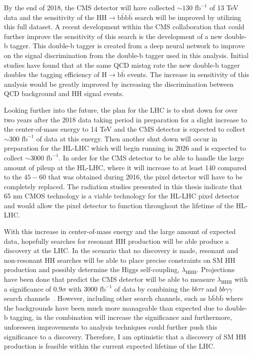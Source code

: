 By the end of 2018, the CMS detector will have collected ${\sim}130$ $\mathrm{fb}^{-1}$ of 13 TeV data and the sensitivity of the $\mathrm{HH}\rightarrow \mathrm{b\bar{b}b\bar{b}}$ search will be improved by utilizing this full dataset. A recent development within the CMS collaboration that could further improve the sensitivity of this search is the development of a new double-b tagger. This double-b tagger is created from a deep neural network to improve on the signal discrimination from the double-b tagger used in this analysis. Initial studies have found that at the same QCD mistag rate the new double-b tagger doubles the tagging efficiency of $\mathrm{H}\rightarrow \mathrm{b\bar{b}}$ events. The increase in sensitivity of this analysis would be greatly improved by increasing the discrimination between QCD background and $\mathrm{HH}$ signal events. 

Looking further into the future, the plan for the LHC is to shut down for over two years after the 2018 data taking period in preparation for a slight increase to the center-of-mass energy to 14 TeV and the CMS detector is expected to collect ${\sim}300$ $\mathrm{fb}^{-1}$ of data at this energy. Then another shut down will occur in preparation for the HL-LHC which will begin running in 2026 and is expected to collect ${\sim}3000$ $\mathrm{fb}^{-1}$. In order for the CMS detector to be able to handle the large amount of pileup at the HL-LHC, where it will increase to at least 140 compared to the $45-60$ that was obtained during 2016, the pixel detector will have to be completely replaced. The radiation studies presented in this thesis indicate that 65 nm CMOS technology is a viable technology for the HL-LHC pixel detector and would allow the pixel detector to function throughout the lifetime of the HL-LHC. 

With this increase in center-of-mass energy and the large amount of expected data, hopefully searches for resonant HH production will be able produce a discovery at the LHC. In the scenario that no discovery is made, resonant and non-resonant HH searches will be able to place precise constraints on SM HH production and possibly determine the Higgs self-coupling, $\lambda_{\mathrm{HHH}}$. Projections have been done that predict the CMS detector will be able to measure $\lambda_{\mathrm{HHH}}$ with a significance of $0.9\sigma$ with 3000 $\mathrm{fb}^{-1}$ of data by combining the $bb\tau\tau$ and $bb\gamma\gamma$ search channels~\cite{HLLHC}. However, including other search channels, such as $\mathrm{b\bar{b}b\bar{b}}$ where the backgrounds have been much more manageable than expected due to double-b tagging, in the combination will increase the significance and furthermore, unforeseen improvements to analysis techniques could further push this significance to a discovery. Therefore, I am optimistic that a discovery of SM HH production is feasible within the current expected lifetime of the LHC.
